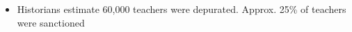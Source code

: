 \documentclass[aspectratio=169]{beamer}
\begin{document}
\begin{frame}
\begin{itemize}
\begin{enumerate}
\begin{enumerate}
                \end{enumerate}
        \end{enumerate}
\medskip
\item  Historians estimate 60,000 teachers were depurated. %
Approx. 25\% of teachers were sanctioned %

\end{itemize}
 
\end{frame}

    

     
\end{document}
